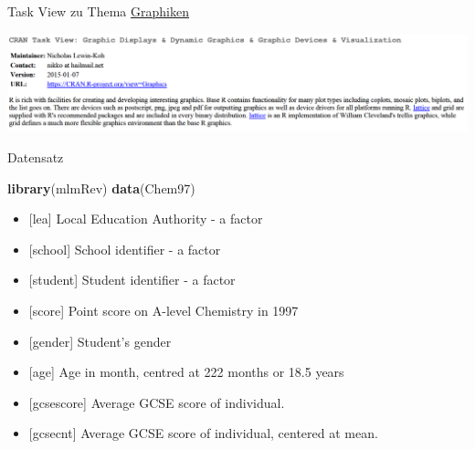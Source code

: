 \documentclass[ignorenonframetext,]{beamer}
\newenvironment{Shaded}{}{}
\newcommand{\KeywordTok}[1]{\textcolor[rgb]{0.00,0.44,0.13}{\textbf{{#1}}}}
\newcommand{\NormalTok}[1]{{#1}}
\providecommand{\tightlist}{%
\setlength{\itemsep}{0pt}\setlength{\parskip}{0pt}}
\begin{document}
\begin{frame}{Task View zu Thema
\href{https://cran.r-project.org/web/views/Graphics.html}{Graphiken}}

\includegraphics{./tex2pdf.956/5e4adb82cb6141da7bafecd33dfdc7d0e44f95dc.png}

\end{frame}

\begin{frame}[fragile]{Datensatz}

\begin{Shaded}
\begin{Highlighting}[]
\KeywordTok{library}\NormalTok{(mlmRev)}
\KeywordTok{data}\NormalTok{(Chem97)}
\end{Highlighting}
\end{Shaded}

\begin{itemize}
\tightlist
\item
  {[}lea{]} Local Education Authority - a factor
\item
  {[}school{]} School identifier - a factor
\item
  {[}student{]} Student identifier - a factor
\item
  {[}score{]} Point score on A-level Chemistry in 1997
\item
  {[}gender{]} Student's gender
\item
  {[}age{]} Age in month, centred at 222 months or 18.5 years
\item
  {[}gcsescore{]} Average GCSE score of individual.
\item
  {[}gcsecnt{]} Average GCSE score of individual, centered at mean.
\end{itemize}

\end{frame}
\end{document}
